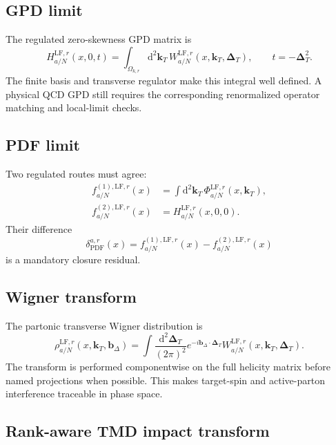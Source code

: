 \documentclass[11pt]{article}
\newcommand{\kT}{\bm{k}_{T}}
\newcommand{\DT}{\bm{\Delta}_{T}}
\newcommand{\bD}{\bm{b}_{\Delta}}
\newcommand{\dd}{\mathrm{d}}
\newcommand{\LF}{\ensuremath{\mathrm{LF}}}
\newcommand{\PDF}{\ensuremath{\mathrm{PDF}}}
\begin{document}
\subsection{GPD limit}

The regulated zero-skewness GPD matrix is
\begin{equation}
 H_{a/N}^{\LF,r}(x,0,t)
 =\int_{\Omega_{k,r}}\dd^2\kT\,
 W_{a/N}^{\LF,r}(x,\kT,\DT),
 \qquad t=-\DT^2.
 \label{eq:h4-gpd-limit}
\end{equation}
The finite basis and transverse regulator make this integral well defined.  A
physical QCD GPD still requires the corresponding renormalized operator
matching and local-limit checks.

\subsection{PDF limit}

Two regulated routes must agree:
\begin{align}
 f_{a/N}^{(1),\LF,r}(x)
 &=\int\dd^2\kT\,
 \Phi_{a/N}^{\LF,r}(x,\kT),
 \label{eq:pdf-route-one}\\
 f_{a/N}^{(2),\LF,r}(x)
 &=H_{a/N}^{\LF,r}(x,0,0).
 \label{eq:pdf-route-two}
\end{align}
Their difference
\begin{equation}
 \delta_{\PDF}^{a,r}(x)
 =f_{a/N}^{(1),\LF,r}(x)-f_{a/N}^{(2),\LF,r}(x)
 \label{eq:pdf-route-residual}
\end{equation}
is a mandatory closure residual.

\subsection{Wigner transform}

The partonic transverse Wigner distribution is
\begin{equation}
 \rho_{a/N}^{\LF,r}(x,\kT,\bD)
 =\int\frac{\dd^2\DT}{(2\pi)^2}
 e^{-i\bD\cdot\DT}
 W_{a/N}^{\LF,r}(x,\kT,\DT).
 \label{eq:h4-wigner-transform}
\end{equation}
The transform is performed componentwise on the full helicity matrix before
named projections when possible.  This makes target-spin and active-parton
interference traceable in phase space.

\subsection{Rank-aware TMD impact transform}
\end{document}
